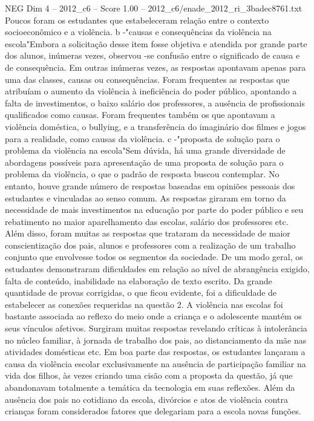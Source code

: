 \begin{textsample}{NEG Dim 4 – 2012\_c6 – Score 1.00 – 2012\_c6/enade\_2012\_ri\_3badec8761.txt}
Poucos foram os estudantes que estabeleceram relação entre o contexto socioeconômico e a violência. b -"causas e consequências da violência na escola"Embora a solicitação desse item fosse objetiva e atendida por grande parte dos alunos, inúmeras vezes, observou -se confusão entre o significado de causa e de consequência.
Em outras inúmeras vezes, as respostas apontavam apenas para uma das classes, causas ou consequências.
Foram frequentes as respostas que atribuíam o aumento da violência à ineficiência do poder público, apontando a falta de investimentos, o baixo salário dos professores, a ausência de profissionais qualificados como causas.
Foram frequentes também os que apontavam a violência doméstica, o bullying, e a transferência do imaginário dos filmes e jogos para a realidade, como causas da violência. c -"proposta de solução para o problema da violência na escola"Sem dúvida, há uma grande diversidade de abordagens possíveis para apresentação de uma proposta de solução para o problema da violência, o que o padrão de resposta buscou contemplar.
No entanto, houve grande número de respostas baseadas em opiniões pessoais dos estudantes e vinculadas ao senso comum.
As respostas giraram em torno da necessidade de mais investimentos na educação por parte do poder público e seu rebatimento no maior aparelhamento das escolas, salário dos professores etc.
Além disso, foram muitas as respostas que trataram da necessidade de maior conscientização dos pais, alunos e professores com a realização de um trabalho conjunto que envolvesse todos os segmentos da sociedade.
De um modo geral, os estudantes demonstraram dificuldades em relação ao nível de abrangência exigido, falta de conteúdo, inabilidade na elaboração de texto escrito.
Da grande quantidade de provas corrigidas, o que ficou evidente, foi a dificuldade de estabelecer as conexões requeridas na questão 2.
A violência nas escolas foi bastante associada ao reflexo do meio onde a criança e o adolescente mantém os seus vínculos afetivos.
Surgiram muitas respostas revelando críticas à intolerância no núcleo familiar, à jornada de trabalho dos pais, ao distanciamento da mãe nas atividades domésticas etc.
Em boa parte das respostas, os estudantes lançaram a causa da violência escolar exclusivamente na ausência de participação familiar na vida dos filhos, às vezes criando uma cisão com a proposta da questão, já que abandonavam totalmente a temática da tecnologia em suas reflexões.
Além da ausência dos pais no cotidiano da escola, divórcios e atos de violência contra crianças foram considerados fatores que delegariam para a escola novas funções.

\end{textsample}
